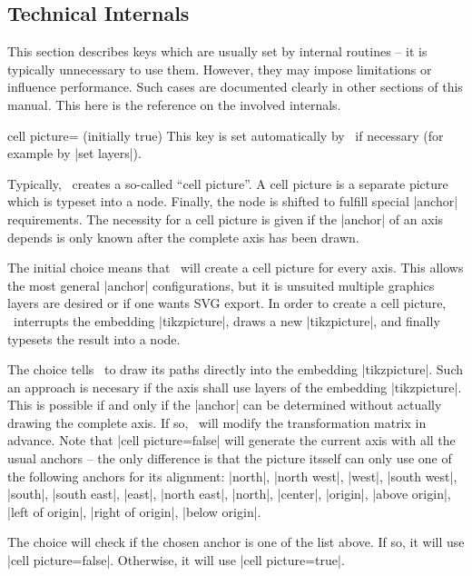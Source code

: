 \subsection{Technical Internals}
{
%

This section describes keys which are usually set by internal routines -- it is typically unnecessary to use them. However, they may impose limitations or influence performance. Such cases are documented clearly in other sections of this manual. This here is the reference on the involved internals.

\begin{pgfplotskey}{cell picture= (initially true)}
	This key is set automatically by \PGFPlots\ if necessary (for example by |set layers|).

	Typically, \PGFPlots\ creates a so-called ``cell picture''. A cell picture is a separate picture which is typeset into a node. Finally, the node is shifted to fulfill special |anchor| requirements. The necessity for a cell picture is given if the |anchor| of an axis depends is only known after the complete axis has been drawn.

	The initial choice  means that \PGFPlots\ will create a cell picture for every axis. This allows the most general |anchor| configurations, but it is unsuited multiple graphics layers are desired or if one wants SVG export. In order to create a cell picture, \PGFPlots\ interrupts the embedding |tikzpicture|, draws a new |tikzpicture|, and finally typesets the result into a node.

	The choice  tells \PGFPlots\ to draw its paths directly into the embedding |tikzpicture|. Such an approach is necesary if the axis shall use layers of the embedding |tikzpicture|. This is possible if and only if the |anchor| can be determined without actually drawing the complete axis. If so, \PGFPlots\ will modify the transformation matrix in advance. Note that |cell picture=false| will generate the current axis with all the usual anchors -- the only difference is that the picture itsself can only use one of the following anchors for its alignment: |north|, |north west|, |west|, |south west|, |south|, |south east|, |east|, |north east|, |north|, |center|, |origin|, |above origin|, |left of origin|, |right of origin|, |below origin|.

	The choice  will check if the chosen anchor is one of the list above. If so, it will use |cell picture=false|. Otherwise, it will use |cell picture=true|.


\end{pgfplotskey}}
